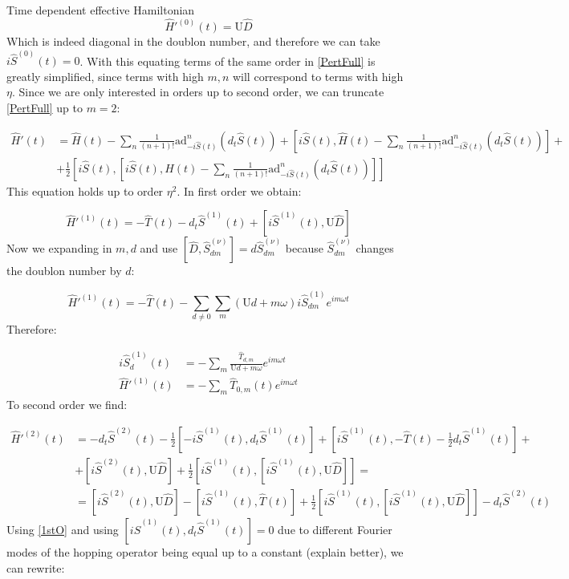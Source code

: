 \begin{section}{Time dependent effective Hamiltonian}
\begin{equation}
\hat{H}'^{(0)}(t) = \text{U}\hat{D}
\end{equation}
Which is indeed diagonal in the doublon number, and therefore we can take $i\hat{S}^{(0)}(t)=0$. With this equating terms of the same order in \ref{PertFull} is greatly simplified, since terms with high $m,n$ will correspond to terms with high $\eta$. Since we are only interested in orders up to second order, we can truncate \ref{PertFull} up to $m=2$:

\begin{align}
\label{PertTrunc}
\hat{H}'(t) &=  \hat{H}(t) - \sum_n \frac{1}{(n+1)!}\text{ad}_{-i\hat{S}(t)}^n (d_t \hat{S}(t)) + [i\hat{S}(t), \hat{H}(t) - \sum_n \frac{1}{(n+1)!}\text{ad}_{-i\hat{S}(t)}^n (d_t \hat{S}(t))] + \nonumber \\
&+ \frac{1}{2} [i\hat{S}(t),[i\hat{S}(t), \hat{H}(t) - \sum_n \frac{1}{(n+1)!}\text{ad}_{-i\hat{S}(t)}^n (d_t \hat{S}(t)) ]]
\end{align}
This equation holds up to order $\eta^2$. In first order we obtain:

\begin{equation}
\label{1stO}
\hat{H}'^{(1)}(t) = -\hat{T}(t) - d_t\hat{S}^{(1)}(t) + \left[ i\hat{S}^{(1)}(t), \text{U}\hat{D} \right]
\end{equation}
Now we expanding in $m,d$ and use $\left[ \hat{D}, \hat{S}^{(\nu)}_{dm} \right] = d\hat{S}^{(\nu)}_{dm}$ because $\hat{S}^{(\nu)}_{dm}$ changes the doublon number by $d$:

\begin{equation}
\hat{H}'^{(1)}(t)=-\hat{T}(t)-\sum_{d\neq 0}\sum_m (\text{U}d+m\omega) i\hat{S}^{(1)}_{dm} e^{im\omega t}
\end{equation}
Therefore:

\begin{align}
i\hat{S}^{(1)}_d(t) &= -\sum_m \frac{\hat{T}_{d,m}}{\text{U}d+m\omega}e^{im\omega t} \label{1stOSpin}\\
\hat{H}'^{(1)}(t) &= -\sum_m \hat{T}_{0,m}(t)e^{im\omega t} \label{1stOH}
\end{align}
To second order we find:

\begin{align}
\hat{H}'^{(2)}(t) &= - d_t\hat{S}^{(2)}(t) - \frac{1}{2}\left[-i\hat{S}^{(1)}(t), d_t\hat{S}^{(1)}(t) \right] + \left[i\hat{S}^{(1)}(t), -\hat{T}(t)-\frac{1}{2}d_t\hat{S}^{(1)}(t) \right] +\nonumber \\
&+ \left[i\hat{S}^{(2)}(t), \text{U}\hat{D} \right] + \frac{1}{2} \left[i\hat{S}^{(1)}(t), \left[i\hat{S}^{(1)}(t), \text{U}\hat{D} \right] \right] = \nonumber \\
&= \left[i\hat{S}^{(2)}(t), \text{U} \hat{D} \right] - \left[ i\hat{S}^{(1)}(t), \hat{T}(t) \right] + \frac{1}{2}\left[ i\hat{S}^{(1)}(t), \left[ i\hat{S}^{(1)}(t), \text{U}\hat{D} \right] \right] - d_t\hat{S}^{(2)}(t)
\end{align}
Using \ref{1stO} and using $\left[ i\hat{S}^{(1)}(t), d_t\hat{S}^{(1)}(t)\right] = 0$ due to different Fourier modes of the hopping operator being equal up to a constant (explain better), we can rewrite:


\end{section}
